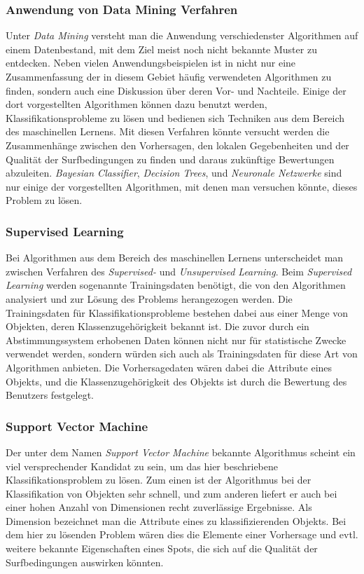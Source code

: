 \subsubsection{Anwendung von Data Mining Verfahren}
Unter \textit{Data Mining} versteht man die Anwendung verschiedenster
Algorithmen auf einem Datenbestand, mit dem Ziel meist noch nicht
bekannte Muster zu entdecken. Neben vielen Anwendungsbeispielen ist in
\cite{Seagaran2007} nicht nur eine Zusammenfassung der in diesem
Gebiet häufig verwendeten Algorithmen zu finden, sondern auch eine
Diskussion über deren Vor- und Nachteile. Einige der dort
vorgestellten Algorithmen können dazu benutzt werden,
Klassifikationsprobleme zu lösen und bedienen sich Techniken aus dem
Bereich des maschinellen Lernens. Mit diesen Verfahren könnte versucht
werden die Zusammenhänge zwischen den Vorhersagen, den lokalen
Gegebenheiten und der Qualität der Surfbedingungen zu finden und
daraus zukünftige Bewertungen abzuleiten. \textit{Bayesian
  Classifier}, \textit{Decision Trees}, und \textit{Neuronale
  Netzwerke} sind nur einige der vorgestellten Algorithmen, mit denen
man versuchen könnte, dieses Problem zu lösen.

\subsubsection{Supervised Learning}
Bei Algorithmen aus dem Bereich des maschinellen Lernens unterscheidet
man zwischen Verfahren des \textit{Supervised-} und
\textit{Unsupervised Learning}. Beim \textit{Supervised Learning}
werden sogenannte Trainingsdaten benötigt, die von den Algorithmen
analysiert und zur Lösung des Problems herangezogen werden. Die
Trainingsdaten für Klassifikationsprobleme bestehen dabei aus einer
Menge von Objekten, deren Klassenzugehörigkeit bekannt ist. Die zuvor
durch ein Abstimmungssystem erhobenen Daten können nicht nur für
statistische Zwecke verwendet werden, sondern würden sich auch als
Trainingsdaten für diese Art von Algorithmen anbieten. Die
Vorhersagedaten wären dabei die Attribute eines Objekts, und die
Klassenzugehörigkeit des Objekts ist durch die Bewertung des Benutzers
festgelegt.

\subsubsection{Support Vector Machine}
Der unter dem Namen \textit{Support Vector Machine} bekannte
Algorithmus scheint ein viel versprechender Kandidat zu sein, um das
hier beschriebene Klassifikationsproblem zu lösen. Zum einen ist der
Algorithmus bei der Klassifikation von Objekten sehr schnell, und zum
anderen liefert er auch bei einer hohen Anzahl von Dimensionen recht
zuverlässige Ergebnisse. Als Dimension bezeichnet man die Attribute
eines zu klassifizierenden Objekts. Bei dem hier zu lösenden Problem
wären dies die Elemente einer Vorhersage und evtl. weitere bekannte
Eigenschaften eines Spots, die sich auf die Qualität der
Surfbedingungen auswirken könnten.

